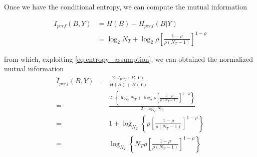 Once we have the conditional entropy, we can compute the mutual information

\begin{align}
    I_{perf}(B, Y) &= H(B) - H_{perf}(B|Y)\nonumber\\
    &= \log_2 N_T +\log_{2}\rho\left[\frac{1-\rho}{\rho(N_T-1)}\right]^{1-\rho}
\end{align}

from which, exploiting \eqref{eq:entropy_assumption}, we can obtained the normalized mutual information
\begin{align}
    \hat{I}_{perf}(B,Y) =& \frac{2\cdot I_{perf}(B, Y)}{H(B) + H(Y)}\nonumber\\
    =&\frac{2\cdot\left\{ \log_2 N_T +\log_{2}\rho\left[\frac{1-\rho}{\rho(N_T-1)}\right]^{1-\rho}\right\}}{2\cdot \log_2 N_T}\nonumber\\
    =& 1 + \log_{N_T}\left\{\rho\left[\frac{1-\rho}{\rho(N_T-1)}\right]^{1-\rho}\right\}\nonumber\\
    =& \log_{N_T}\left\{N_T\rho\left[\frac{1-\rho}{\rho(N_T-1)}\right]^{1-\rho}\right\}\nonumber
\end{align}

